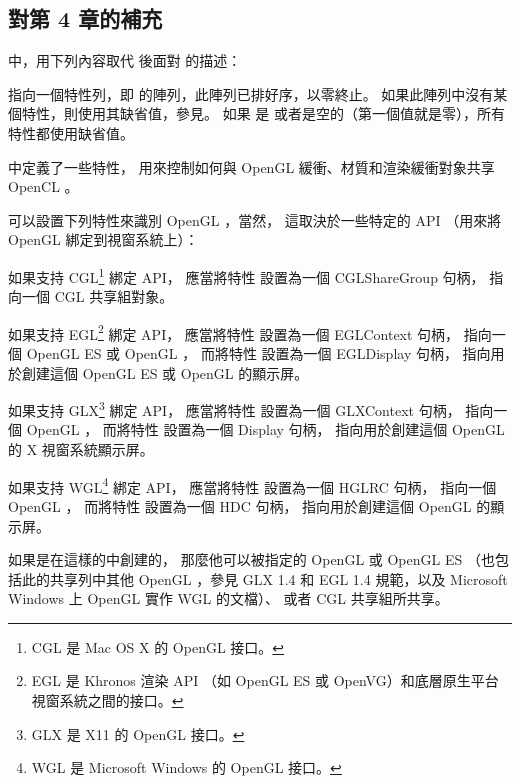 \subsection{對第 4 章的補充}

\insection[contexts]中，用下列內容取代  後面對  的描述：

 指向一個特性列，即  的陣列，此陣列已排好序，以零終止。
如果此陣列中沒有某個特性，則使用其缺省值，參見。
如果  是  或者是空的（第一個值就是零），所有特性都使用缺省值。

\insection[clShareGl]中定義了一些特性，
用來控制如何與 OpenGL 緩衝、材質和渲染緩衝對象共享 OpenCL 。

可以設置下列特性來識別 OpenGL ，當然，
這取決於一些特定的 API （用來將 OpenGL 綁定到視窗系統上）：
\startigBase
\item 如果支持 CGL\footnote{CGL 是 Mac OS X 的 OpenGL 接口。} 綁定 API，
應當將特性  設置為一個 CGLShareGroup 句柄，
指向一個 CGL 共享組對象。

\item 如果支持 EGL\footnote{%
EGL 是 Khronos 渲染 API （如 OpenGL ES 或 OpenVG）和底層原生平台視窗系統之間的接口。%
} 綁定 API，
應當將特性  設置為一個 EGLContext 句柄，
指向一個 OpenGL ES 或 OpenGL ，
而將特性  設置為一個 EGLDisplay 句柄，
指向用於創建這個 OpenGL ES 或 OpenGL 的顯示屏。

\item 如果支持 GLX\footnote{GLX 是 X11 的 OpenGL 接口。} 綁定 API，
應當將特性  設置為一個 GLXContext 句柄，
指向一個 OpenGL ，
而將特性  設置為一個 Display 句柄，
指向用於創建這個 OpenGL 的 X 視窗系統顯示屏。

\item 如果支持 WGL\footnote{WGL 是 Microsoft Windows 的 OpenGL 接口。} 綁定 API，
應當將特性  設置為一個 HGLRC 句柄，
指向一個 OpenGL ，
而將特性  設置為一個 HDC 句柄，
指向用於創建這個 OpenGL 的顯示屏。
\stopigBase

如果是在這樣的中創建的，
那麼他可以被指定的 OpenGL 或 OpenGL ES 
（也包括此的共享列中其他 OpenGL ，參見 GLX 1.4 和 EGL 1.4 規範，以及 Microsoft Windows 上 OpenGL 實作 WGL 的文檔）、
或者 CGL 共享組所共享。

